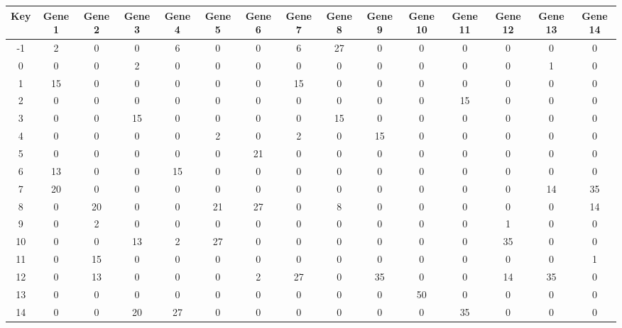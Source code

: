\begin{tabular}{|c|c|c|c|c|c|c|c|c|c|c|c|c|c|c|}
\hline
Key & Gene 1 & Gene 2 & Gene 3 & Gene 4 & Gene 5 & Gene 6 & Gene 7 & Gene 8 & Gene 9 & Gene 10 & Gene 11 & Gene 12 & Gene 13 & Gene 14 \\
\hline
-1 & 2 & 0 & 0 & 6 & 0 & 0 & 6 & 27 & 0 & 0 & 0 & 0 & 0 & 0 \\
0 & 0 & 0 & 2 & 0 & 0 & 0 & 0 & 0 & 0 & 0 & 0 & 0 & 1 & 0 \\
1 & 15 & 0 & 0 & 0 & 0 & 0 & 15 & 0 & 0 & 0 & 0 & 0 & 0 & 0 \\
2 & 0 & 0 & 0 & 0 & 0 & 0 & 0 & 0 & 0 & 0 & 15 & 0 & 0 & 0 \\
3 & 0 & 0 & 15 & 0 & 0 & 0 & 0 & 15 & 0 & 0 & 0 & 0 & 0 & 0 \\
4 & 0 & 0 & 0 & 0 & 2 & 0 & 2 & 0 & 15 & 0 & 0 & 0 & 0 & 0 \\
5 & 0 & 0 & 0 & 0 & 0 & 21 & 0 & 0 & 0 & 0 & 0 & 0 & 0 & 0 \\
6 & 13 & 0 & 0 & 15 & 0 & 0 & 0 & 0 & 0 & 0 & 0 & 0 & 0 & 0 \\
7 & 20 & 0 & 0 & 0 & 0 & 0 & 0 & 0 & 0 & 0 & 0 & 0 & 14 & 35 \\
8 & 0 & 20 & 0 & 0 & 21 & 27 & 0 & 8 & 0 & 0 & 0 & 0 & 0 & 14 \\
9 & 0 & 2 & 0 & 0 & 0 & 0 & 0 & 0 & 0 & 0 & 0 & 1 & 0 & 0 \\
10 & 0 & 0 & 13 & 2 & 27 & 0 & 0 & 0 & 0 & 0 & 0 & 35 & 0 & 0 \\
11 & 0 & 15 & 0 & 0 & 0 & 0 & 0 & 0 & 0 & 0 & 0 & 0 & 0 & 1 \\
12 & 0 & 13 & 0 & 0 & 0 & 2 & 27 & 0 & 35 & 0 & 0 & 14 & 35 & 0 \\
13 & 0 & 0 & 0 & 0 & 0 & 0 & 0 & 0 & 0 & 50 & 0 & 0 & 0 & 0 \\
14 & 0 & 0 & 20 & 27 & 0 & 0 & 0 & 0 & 0 & 0 & 35 & 0 & 0 & 0 \\
\hline
\end{tabular}